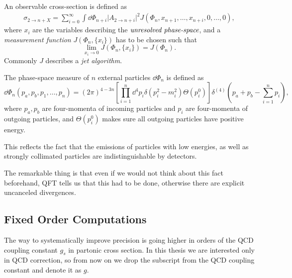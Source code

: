 An observable cross-section is defined as
\begin{multline}
  \sigma_{2\rightarrow n + X} = %
  \sum_{i=0}^{\infty} \int \dd\Phi_{n+i} \vert A_{2\rightarrow n+i} \vert^2 J(\Phi_{n},x_{n+1},\ldots,x_{n+i},0,\ldots,0),
  \label{eq:IRsafeXS}
\end{multline}
where $x_i$ are the variables describing the $\emph{unresolved phase-space}$, and
a \emph{measurement function} $J(\Phi_n, \{x_i\})$ has to be chosen such that
\begin{equation}
  \lim_{x_i\to 0}J(\Phi_n, \{x_i\}) = J(\Phi_n).
  \label{eq:IRsafeConditions}
\end{equation}
Commonly $J$ describes a \emph{jet algorithm}.

The phase-space measure of $n$ external particles $\dd\Phi_n$ is defined as
\begin{equation}
  \dd\Phi_n(p_a,p_b,p_1,\ldots,p_n) = (2\pi)^{4-3n} \left[ \prod_{i=1}^{n}\dd^4 p_i \delta(p_i^2-m_i^2) \Theta(p_i^{0}) \right] \delta^{(4)}\left(p_a+p_b - \sum_{i=1}^{n}p_i\right),
  \label{eq:PS}
\end{equation}
where $p_a,p_b$ are four-momenta of incoming particles and $p_i$ are four-momenta of outgoing particles, and
$\Theta(p_i^{0})$ makes sure all outgoing particles have positive energy.


This reflects the fact that the emissions of particles with low energies, as well
as strongly collimated particles are indistinguishable by detectors.

The remarkable thing is that even if we would not think about this fact beforehand, QFT tells us that
this had to be done, otherwise there are explicit uncanceled divergences.


\subsection{Fixed Order Computations}
\label{sec:fixed_order}


The way to systematically improve precision is going higher in orders of the QCD coupling constant $g_s$
in partonic cross section. In this thesis we are interested only in QCD correction, so from now on
we drop the subscript from the QCD coupling constant and denote it as $g$.

